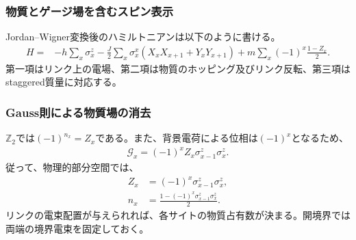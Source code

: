 \documentclass[a4paper,10.5pt]{article}
\numberwithin{equation}{section}
\begin{document}
\subsubsection{物質とゲージ場を含むスピン表示}
Jordan--Wigner変換後のハミルトニアンは以下のように書ける。
\begin{align}
H={}&-h\sum_x\sigma_x^z
-\frac J2\sum_x\sigma_x^x(X_xX_{x+1}+Y_xY_{x+1})
+m\sum_x(-1)^x\frac{1-Z_x}{2}.
\label{eq:matter-gauge-spin}
\end{align}
第一項はリンク上の電場、第二項は物質のホッピング及びリンク反転、第三項はstaggered質量に対応する。

\subsubsection{Gauss則による物質場の消去}
$\mathbb Z_2$では$(-1)^{n_x}=Z_x$である。また、背景電荷による位相は$(-1)^x$となるため、
\begin{align}                                                                                       
\mathcal G_x=(-1)^x Z_x\sigma_{x-1}^z\sigma_x^z.
\end{align}
従って、物理的部分空間では、
\begin{align}
Z_x&=(-1)^x\sigma_{x-1}^z\sigma_x^z,\label{eq:gauss-elim}\\
n_x&=\frac{1-(-1)^x\sigma_{x-1}^z\sigma_x^z}{2}.
\label{eq:n-elim}
\end{align}
リンクの電束配置が与えられれば、各サイトの物質占有数が決まる。開境界では両端の境界電束を固定しておく。
\end{document}

